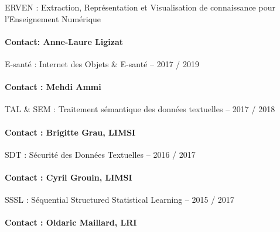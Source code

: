 \begin{frame}{ERVEN : Extraction, Représentation et Visualisation de connaissance pour
l'Enseignement Numérique}
\framesubtitle{Contact: Anne-Laure Ligizat}
\end{frame}

\begin{frame}{ E-santé : Internet des Objets \& E-santé – 2017 / 2019}
\framesubtitle{Contact : Mehdi Ammi}
\end{frame}


\begin{frame}{ TAL \& SEM : Traitement sémantique des données textuelles – 2017 / 2018}
\framesubtitle{Contact : Brigitte Grau, LIMSI}
\end{frame}

\begin{frame}{SDT : Sécurité des Données Textuelles – 2016 / 2017}
\framesubtitle{Contact : Cyril Grouin, LIMSI}
\end{frame}

\begin{frame}{SSSL : Séquential Structured Statistical Learning – 2015 / 2017}
\framesubtitle{Contact : Oldaric Maillard, LRI}
\end{frame}
